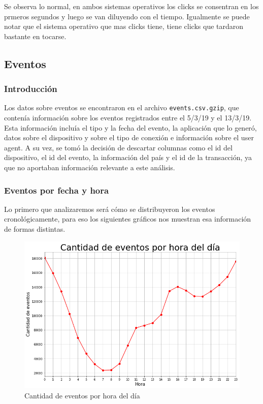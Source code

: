 \documentclass[a4paper, 12pt]{article}
\newcommand\tab[1][1cm]{\hspace*{#1}}
\begin{document}
		\tab Se observa lo normal, en ambos sistemas operativos los clicks se consentran en los prmeros segundos y luego se van diluyendo con el tiempo. Igualmente se puede notar que el sistema operativo que mas clicks tiene, tiene clicks que tardaron bastante en tocarse.



		

\clearpage
\subsection{Eventos}
	\subsubsection{Introducción}
		Los datos sobre eventos se encontraron en el archivo \texttt{events.csv.gzip}, que contenía información sobre los eventos registrados entre el 5/3/19 y el 13/3/19. Esta información incluía el tipo y la fecha del evento, la aplicación que lo generó, datos sobre el dispositivo y sobre el tipo de conexión e información sobre el user agent. A su vez, se tomó la decisión de descartar columnas como el id del dispositivo, el id del evento, la información del país y el id de la transacción, ya que no aportaban información relevante a este análisis.
		
	\subsubsection{Eventos por fecha y hora}
		
		Lo primero que analizaremos será cómo se distribuyeron los eventos cronológicamente, para eso los siguientes gráficos nos muestran esa información de formas distintas.
		
		\FloatBarrier
		\begin{figure}[h]
			\centering
			\includegraphics[width=\textwidth]{images/events/eventsxhora.png}
			\caption{Cantidad de eventos por hora del día}
		\end{figure}
		\FloatBarrier
		
\end{document}
